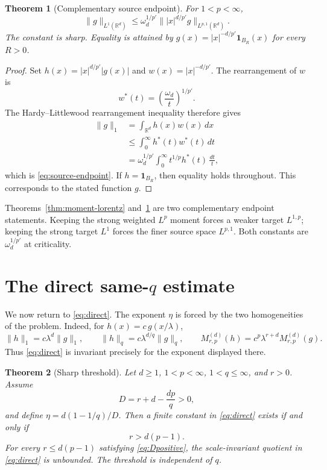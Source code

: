 \documentclass[11pt]{amsart}
\newtheorem{theorem}{Theorem}[section]
\theoremstyle{remark}
\newcommand{\R}{\mathbb R}
\newcommand{\norm}[1]{\lVert #1\rVert}
\newcommand{\ind}{\mathbf 1}
\newcommand{\Mrp}{M_{r,p}^{(d)}}
\begin{document}
\begin{theorem}[Complementary source endpoint]\label{thm:source-endpoint}
For $1<p<\infty$,
\begin{equation}\label{eq:source-endpoint}
 \norm{g}_{L^1(\R^d)}
 \le \omega_d^{1/p'}
 \norm{|x|^{d/p'}g}_{L^{p,1}(\R^d)}.
\end{equation}
The constant is sharp.  Equality is attained by
$g(x)=|x|^{-d/p'}\ind_{B_R}(x)$ for every $R>0$.
\end{theorem}

\begin{proof}
Set $h(x)=|x|^{d/p'}|g(x)|$ and $w(x)=|x|^{-d/p'}$.  The rearrangement of
$w$ is
\[
 w^*(t)=\left(\frac{\omega_d}{t}\right)^{1/p'}.
\]
The Hardy--Littlewood rearrangement inequality therefore gives
\begin{align*}
 \norm{g}_1
 &=\int_{\R^d}h(x)w(x)\,dx\\
 &\le\int_0^\infty h^*(t)w^*(t)\,dt\\
 &=\omega_d^{1/p'}\int_0^\infty
    t^{1/p}h^*(t)\,\frac{dt}{t},
\end{align*}
which is \eqref{eq:source-endpoint}.  If
$h=\ind_{B_R}$, then equality holds throughout.  This corresponds to the
stated function $g$.
\end{proof}

Theorems~\ref{thm:moment-lorentz} and~\ref{thm:source-endpoint} are two
complementary endpoint statements.  Keeping the strong weighted $L^p$
moment forces a weaker target $L^{1,p}$; keeping the strong target $L^1$
forces the finer source space $L^{p,1}$.  Both constants are
$\omega_d^{1/p'}$ at criticality.

\section[The direct same-q estimate]{The direct same-$q$ estimate}\label{sec:direct}

We now return to \eqref{eq:direct}.  The exponent $\eta$ is forced by the
two homogeneities of the problem.  Indeed, for
$h(x)=c\,g(x/\lambda)$,
\[
 \norm{h}_1=c\lambda^d\norm{g}_1,
 \qquad
 \norm{h}_q=c\lambda^{d/q}\norm{g}_q,
 \qquad
 \Mrp(h)=c^p\lambda^{r+d}\Mrp(g).
\]
Thus \eqref{eq:direct} is invariant precisely for the exponent displayed
there.

\begin{theorem}[Sharp threshold]\label{thm:direct}
Let $d\ge1$, $1<p<\infty$, $1<q\le\infty$, and $r>0$.  Assume
\begin{equation}\label{eq:Dpositive}
 D=r+d-\frac{dp}{q}>0,
\end{equation}
and define $\eta=d(1-1/q)/D$.  Then a finite constant in
\eqref{eq:direct} exists if and only if
\[
 r>d(p-1).
\]
For every $r\le d(p-1)$ satisfying \eqref{eq:Dpositive}, the
scale-invariant quotient in \eqref{eq:direct} is unbounded.  The threshold
is independent of $q$.
\end{theorem}
\end{document}
